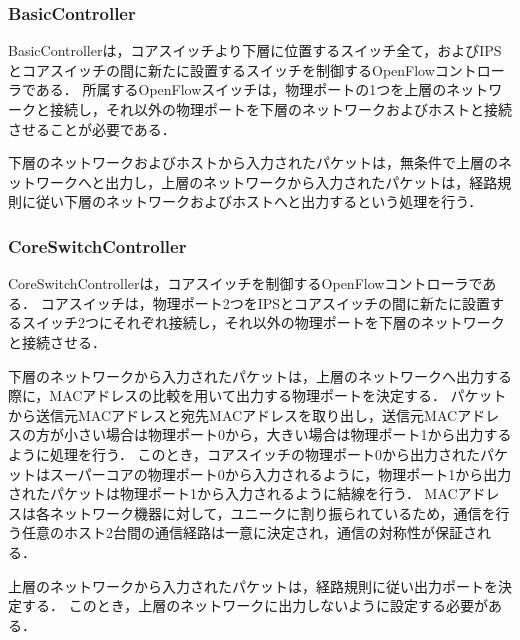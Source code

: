 \subsubsection{BasicController}

BasicControllerは，コアスイッチより下層に位置するスイッチ全て，およびIPSとコアスイッチの間に新たに設置するスイッチを制御するOpenFlowコントローラである．
所属するOpenFlowスイッチは，物理ポートの1つを上層のネットワークと接続し，それ以外の物理ポートを下層のネットワークおよびホストと接続させることが必要である．

下層のネットワークおよびホストから入力されたパケットは，無条件で上層のネットワークへと出力し，上層のネットワークから入力されたパケットは，経路規則に従い下層のネットワークおよびホストへと出力するという処理を行う．

\subsubsection{CoreSwitchController}

CoreSwitchControllerは，コアスイッチを制御するOpenFlowコントローラである．
コアスイッチは，物理ポート2つをIPSとコアスイッチの間に新たに設置するスイッチ2つにそれぞれ接続し，それ以外の物理ポートを下層のネットワークと接続させる．

下層のネットワークから入力されたパケットは，上層のネットワークへ出力する際に，MACアドレスの比較を用いて出力する物理ポートを決定する．
パケットから送信元MACアドレスと宛先MACアドレスを取り出し，送信元MACアドレスの方が小さい場合は物理ポート0から，大きい場合は物理ポート1から出力するように処理を行う．
このとき，コアスイッチの物理ポート0から出力されたパケットはスーパーコアの物理ポート0から入力されるように，物理ポート1から出力されたパケットは物理ポート1から入力されるように結線を行う．
MACアドレスは各ネットワーク機器に対して，ユニークに割り振られているため，通信を行う任意のホスト2台間の通信経路は一意に決定され，通信の対称性が保証される．

上層のネットワークから入力されたパケットは，経路規則に従い出力ポートを決定する．
このとき，上層のネットワークに出力しないように設定する必要がある．